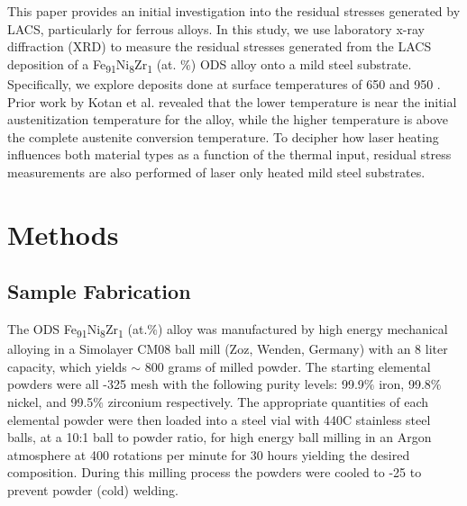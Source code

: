 	This paper provides an initial investigation into the residual stresses generated by LACS, particularly for ferrous alloys. In this study, we use laboratory x-ray diffraction (XRD) to measure the residual stresses generated from the LACS deposition of a Fe\textsubscript{91}Ni\textsubscript{8}Zr\textsubscript{1}\textsubscript{ } (at. $\%$) ODS alloy onto a mild steel substrate. Specifically, we explore deposits done at surface temperatures of 650 \celsius{} and 950 \celsius{}. Prior work by Kotan et al. \cite{RN550} revealed that the lower temperature is near the initial austenitization temperature for the alloy, while the higher temperature is above the complete austenite conversion temperature. To decipher how laser heating influences both material types as a function of the thermal input, residual stress measurements are also performed of laser only heated mild steel substrates.


\section*{Methods}

	\subsection*{Sample Fabrication}
	
		The ODS Fe\textsubscript{91}Ni\textsubscript{8}Zr\textsubscript{1}\textsubscript{ }(at.$\%$) alloy was manufactured by high energy mechanical alloying in a Simolayer CM08 ball mill (Zoz, Wenden, Germany) with an 8 liter capacity, which yields $ \sim $  800 grams of milled powder. The starting elemental powders were all -325 mesh with the following purity levels: 99.9$\%$  iron, 99.8$\%$  nickel, and 99.5$\%$  zirconium respectively. The appropriate quantities of each elemental powder were then loaded into a steel vial with 440C stainless steel balls, at a 10:1 ball to powder ratio, for high energy ball milling in an Argon atmosphere at 400 rotations per minute for 30 hours yielding the desired composition. During this milling process the powders were cooled to -25 \celsius{} to prevent powder (cold) welding.
		
